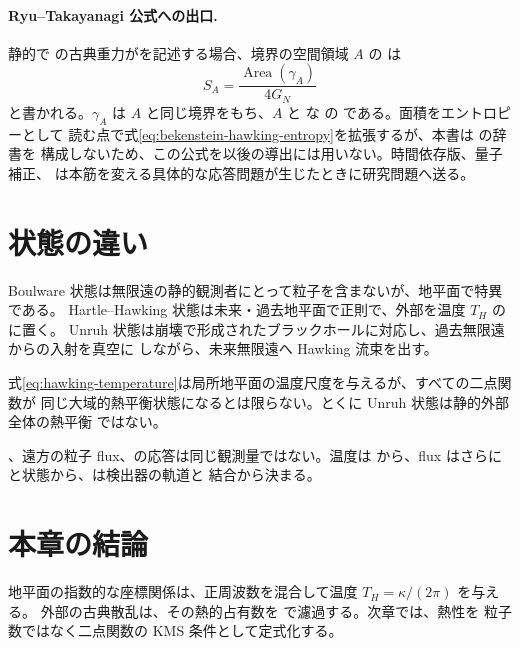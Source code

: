 \paragraph{Ryu--Takayanagi 公式への出口.}
静的で の古典重力がを記述する場合、境界の空間領域 $A$ の
 は
\begin{equation}
S_A
=
\frac{\operatorname{Area}(\gamma_A)}{4G_N}
\label{eq:ryu-takayanagi-signpost}
\end{equation}
と書かれる。$\gamma_A$ は $A$ と同じ境界をもち、$A$ と  な  の
 である\cite{Ryu:2006bv}。面積をエントロピーとして
読む点で式\eqref{eq:bekenstein-hawking-entropy}を拡張するが、本書は  の辞書を
構成しないため、この公式を以後の導出には用いない。時間依存版、量子補正、 は本筋を変える具体的な応答問題が生じたときに研究問題へ送る。

\section{状態の違い}

Boulware 状態は無限遠の静的観測者にとって粒子を含まないが、地平面で特異である。
Hartle--Hawking 状態は未来・過去地平面で正則で、外部を温度 $T_H$ のに置く。
Unruh 状態は崩壊で形成されたブラックホールに対応し、過去無限遠からの入射を真空に
しながら、未来無限遠へ Hawking 流束を出す。

式\eqref{eq:hawking-temperature}は局所地平面の温度尺度を与えるが、すべての二点関数が
同じ大域的熱平衡状態になるとは限らない。とくに Unruh 状態は静的外部全体の熱平衡
ではない。

\begin{warningbox}
、遠方の粒子 flux、の応答は同じ観測量ではない。温度は
から、flux はさらに  と状態から、は検出器の軌道と
結合から決まる。
\end{warningbox}

\section{本章の結論}

地平面の指数的な座標関係は、正周波数を混合して温度 $T_H=\kappa/(2\pi)$ を与える。
外部の古典散乱は、その熱的占有数を  で濾過する。次章では、熱性を
粒子数ではなく二点関数の KMS 条件として定式化する。
